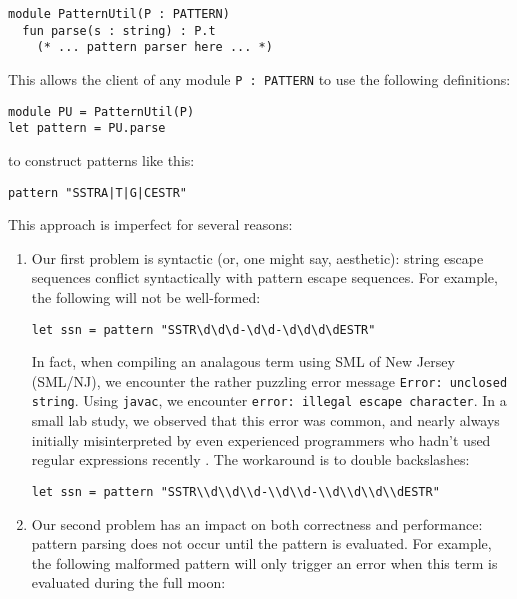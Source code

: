 \begin{lstlisting}[numbers=none]
module PatternUtil(P : PATTERN)
  fun parse(s : string) : P.t
    (* ... pattern parser here ... *)
\end{lstlisting}
This allows the client of any module \lstinline{P : PATTERN} to use the following definitions:
\begin{lstlisting}[numbers=none]
module PU = PatternUtil(P)
let pattern = PU.parse
\end{lstlisting}
to construct patterns like this:
\begin{lstlisting}[numbers=none]
pattern "SSTRA|T|G|CESTR"
\end{lstlisting}
This approach is imperfect for several reasons:
\begin{enumerate} 
\item Our first problem is syntactic (or, one might say, aesthetic): string escape sequences conflict syntactically with pattern escape sequences. For example, the following will not be well-formed:
\begin{lstlisting}[numbers=none,mathescape=|]
let ssn = pattern "SSTR\d\d\d-\d\d-\d\d\d\dESTR"
\end{lstlisting}
In fact, when compiling an analagous term using SML of New Jersey (SML/NJ), we encounter the rather puzzling error message \verb|Error: unclosed string|. Using \verb|javac|, we encounter \verb|error: illegal escape character|. In a small lab study, we observed that this error was common, and nearly always initially misinterpreted by even experienced programmers who hadn't used regular expressions recently \cite{Omar:2012:ACC:2337223.2337324}. The workaround is to  double backslashes:
\begin{lstlisting}[numbers=none]
let ssn = pattern "SSTR\\d\\d\\d-\\d\\d-\\d\\d\\d\\dESTR"
\end{lstlisting}


\item Our second problem has an impact on both correctness and performance: pattern parsing does not occur until the pattern is evaluated. For example, the following malformed pattern will only trigger an error when this term is evaluated during the full moon: %


\end{enumerate}

